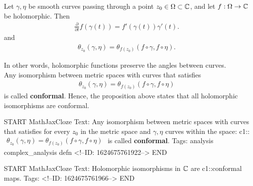 \documentclass{memoir}
\begin{document}
\begin{prop}
	Let \(\gamma ,\eta \) be smooth curves passing through a point \(z_0 \in \Omega\subset \mathbb{C}\), and let \(f:\Omega \to \mathbb{C}\) be holomorphic. Then
	\begin{align*}
		\frac{\partial }{\partial t} f(\gamma (t)) = f'(\gamma (t)) \gamma '(t). 
	\end{align*}
	and
	\begin{align*}
		\theta_{z_0}(\gamma,\eta ) = \theta_{f(z_0)}(f\circ \gamma , f\circ \eta ).
	\end{align*}
\end{prop}
In other words, holomorphic functions preserve the angles between curves.\\

Any isomorphism between metric spaces with curves that satisfies
\begin{align*}
	\theta_{z_0}(\gamma ,\eta ) = \theta_{f(z_0)}(f\circ \gamma , f\circ \eta )
\end{align*}
is called \textbf{conformal}. Hence, the proposition above states that all holomorphic isomorphisms are conformal.

\begin{anki}
START
MathJaxCloze
Text: Any isomorphism between metric spaces with curves that satisfies for every \(z_0\) in the metric space and \(\gamma ,\eta \) curves within the space:
 {{c1::\(\begin{align*}
        	\theta_{z_0}(\gamma ,\eta ) = \theta_{f(z_0)}(f\circ \gamma , f\circ \eta )
        \end{align*}\)}}
is called \textbf{conformal}.
Tags: analysis complex_analysis defn
<!--ID: 1624675761922-->
END
\end{anki}

\begin{anki}
START
MathJaxCloze
Text: Holomorphic isomorphisms in \(\mathbb{C}\) are {{c1::conformal}} maps.
Tags: 
<!--ID: 1624675761966-->
END
\end{anki}
\end{document}
